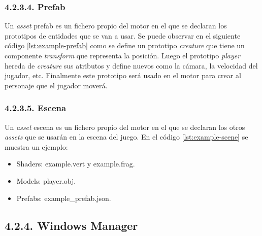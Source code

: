 \subsubsection*{4.2.3.4. Prefab}\label{sec:workflow_managers_assets_prefab}

Un \textit{asset} prefab es un fichero propio del motor en el que se declaran los prototipos de entidades que se van a usar.
Se puede observar en el siguiente código \ref{lst:example-prefab} como se define un prototipo \textit{creature} que tiene
un componente \textit{transform} que representa la posición. Luego el prototipo \textit{player} hereda de \textit{creature}
sus atributos y define nuevos como la cámara, la velocidad del jugador, etc. Finalmente este prototipo será usado en el motor para crear al personaje que el jugador moverá.


\subsubsection*{4.2.3.5. Escena}\label{sec:workflow_managers_assets_scene}

Un \textit{asset} escena es un fichero propio del motor en el que se declaran los otros \textit{assets} que se usarán en la escena del juego.
En el código \ref{lst:example-scene} se muestra un ejemplo:
\begin{itemize}
    \item Shaders: example.vert y example.frag.
    \item Models: player.obj.
    \item Prefabs: example\_prefab.json.
\end{itemize}


\subsection*{4.2.4. Windows Manager}\label{sec:workflow_managers_windows}

